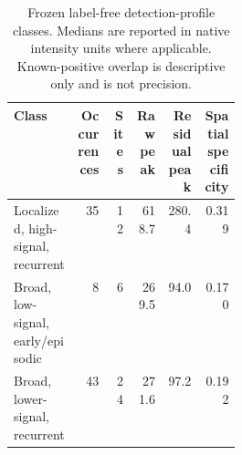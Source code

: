 \begin{table}[!htbp]
\centering
\caption{Frozen label-free detection-profile classes. Medians are reported in native intensity units where applicable. Known-positive overlap is descriptive only and is not precision.}
\label{tab:detection-profile-classes}
\small
\begin{tabular}{p{0.29\linewidth}rrrrr}
\toprule
Class & Occurrences & Sites & Raw peak & Residual peak & Spatial specificity \\
\midrule
Localized, high-signal, recurrent & 35 & 12 & 618.7 & 280.4 & 0.319 \\
Broad, low-signal, early/episodic & 8 & 6 & 269.5 & 94.0 & 0.170 \\
Broad, lower-signal, recurrent & 43 & 24 & 271.6 & 97.2 & 0.192 \\
\bottomrule
\end{tabular}
\end{table}
